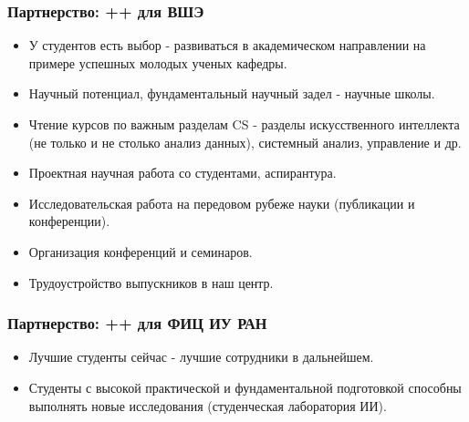 \documentclass[default]{beamer}
\begin{document}
	\begin{frame}
		\frametitle{Партнерство: ++ для ВШЭ}
		
		\begin{itemize}
			\item У студентов есть выбор - развиваться в академическом направлении на примере успешных молодых ученых кафедры.
			\item Научный потенциал, фундаментальный научный задел - научные школы.
			\item Чтение курсов по важным разделам CS - разделы искусственного интеллекта (не только и не столько анализ данных), системный анализ, управление и др.
			\item Проектная научная работа со студентами, аспирантура.
			\item Исследовательская работа на передовом рубеже науки (публикации и конференции).
			\item Организация конференций и семинаров.
			\item Трудоустройство выпускников в наш центр.
		\end{itemize}
	\end{frame}
	
	\begin{frame}
		\frametitle{Партнерство: ++ для ФИЦ ИУ РАН}
		
		\begin{itemize}
			\item Лучшие студенты сейчас - лучшие сотрудники в дальнейшем.
			\item Студенты с высокой практической и фундаментальной подготовкой способны выполнять новые исследования (студенческая лаборатория ИИ).
		\end{itemize}
	\end{frame}
	
\end{document}
